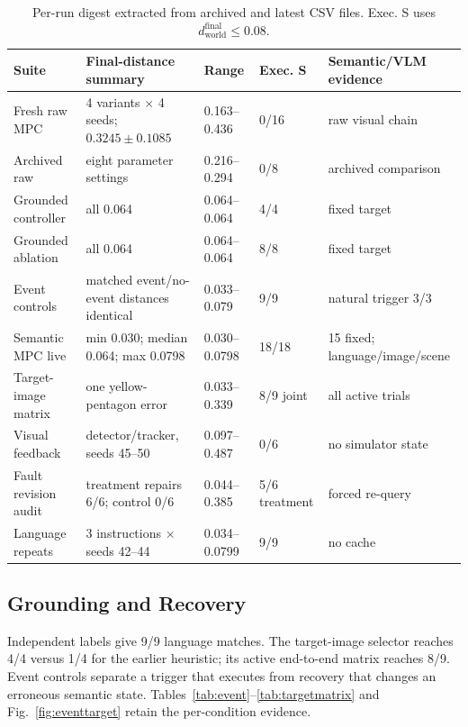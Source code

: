 \documentclass[conference]{IEEEtran}
\newcommand{\distw}{d_{\mathrm{world}}}
\begin{document}
\begin{table}[!t]
\centering
\caption{Per-run digest extracted from archived and latest CSV files. Exec. S uses $\distw^{\mathrm{final}}\leq0.08$.}
\label{tab:perrun}
\scriptsize
\renewcommand{\arraystretch}{0.88}
\setlength{\tabcolsep}{2pt}
\begin{tabular}{@{}p{}p{}p{}p{}p{}@{}}
\toprule
Suite & Final-distance summary & Range & Exec. S & Semantic/VLM evidence \\
\midrule
Fresh raw MPC & 4 variants $\times$ 4 seeds; $0.3245\pm0.1085$ & 0.163--0.436 & 0/16 & raw visual chain \\
Archived raw & eight parameter settings & 0.216--0.294 & 0/8 & archived comparison \\
Grounded controller & all 0.064 & 0.064--0.064 & 4/4 & fixed target \\
Grounded ablation & all 0.064 & 0.064--0.064 & 8/8 & fixed target \\
Event controls & matched event/no-event distances identical & 0.033--0.079 & 9/9 & natural trigger 3/3 \\
Semantic MPC live & min 0.030; median 0.064; max 0.0798 & 0.030--0.0798 & 18/18 & 15 fixed; language/image/scene \\
Target-image matrix & one yellow-pentagon error & 0.033--0.339 & 8/9 joint & all active trials \\
Visual feedback & detector/tracker, seeds 45--50 & 0.097--0.487 & 0/6 & no simulator state \\
Fault revision audit & treatment repairs 6/6; control 0/6 & 0.044--0.385 & 5/6 treatment & forced re-query \\
Language repeats & 3 instructions $\times$ seeds 42--44 & 0.034--0.0799 & 9/9 & no cache \\
\bottomrule
\end{tabular}
\setlength{\tabcolsep}{6pt}
\renewcommand{\arraystretch}{1.0}
\end{table}

\subsection{Grounding and Recovery}
Independent labels give 9/9 language matches. The target-image selector reaches 4/4 versus 1/4 for the earlier heuristic; its active end-to-end matrix reaches 8/9. Event controls separate a trigger that executes from recovery that changes an erroneous semantic state. Tables~\ref{tab:event}--\ref{tab:targetmatrix} and Fig.~\ref{fig:eventtarget} retain the per-condition evidence.
\end{document}
